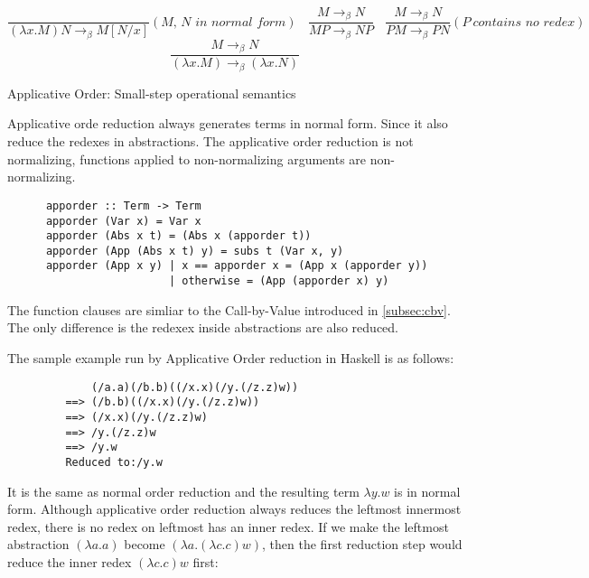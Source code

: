 \begin{equation*}
\frac{}{(\lambda x.M)N \rightarrow _\beta M[N/x]}(\textit{M, N in normal form})\ \ \ \ 
\frac{M \rightarrow _\beta N}{MP \rightarrow _\beta NP}\ \ \ \ 
\frac{M \rightarrow _\beta N}{PM \rightarrow _\beta PN}(P\ \textit{contains no redex})\ \ \ \ 
\end{equation*}
\begin{equation*}
\frac{M \rightarrow _\beta N}{(\lambda x.M) \rightarrow _\beta (\lambda x.N)}
\end{equation*}
\begin{center}
Applicative Order: Small-step operational semantics
\end{center}

Applicative orde reduction always generates terms in normal form. Since it also reduce the redexes in abstractions. The applicative order reduction is not normalizing, functions applied to non-normalizing arguments are non-normalizing.



\begin{verbatim}
      apporder :: Term -> Term
      apporder (Var x) = Var x
      apporder (Abs x t) = (Abs x (apporder t))
      apporder (App (Abs x t) y) = subs t (Var x, y)
      apporder (App x y) | x == apporder x = (App x (apporder y))
                         | otherwise = (App (apporder x) y)  
\end{verbatim}

The function clauses are simliar to the Call-by-Value introduced in \ref{subsec:cbv}. The only difference is the redexex inside abstractions are also reduced.

\begin{exmp}
\normalfont The sample example run by Applicative Order reduction in Haskell is as follows:
\end{exmp}

\begin{verbatim}
             (/a.a)(/b.b)((/x.x)(/y.(/z.z)w))
         ==> (/b.b)((/x.x)(/y.(/z.z)w))
         ==> (/x.x)(/y.(/z.z)w)
         ==> /y.(/z.z)w
         ==> /y.w
         Reduced to:/y.w
\end{verbatim}

It is the same as normal order reduction and the resulting term $\lambda y.w$ is in normal form. Although applicative order reduction always reduces the leftmost innermost redex, there is no redex on leftmost has an inner redex. If we make the leftmost abstraction $(\lambda a.a)$ become $(\lambda a.(\lambda c.c)w)$, then the first reduction step would reduce the inner redex $(\lambda c.c)w$ first:

